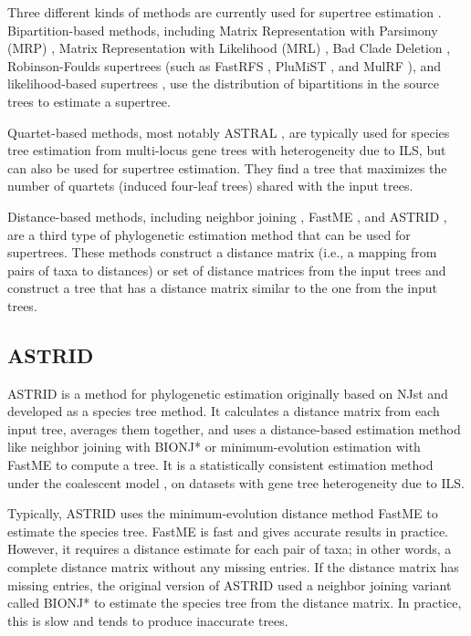 Three different kinds of methods are currently used for supertree estimation \cite{warnow2018supertree}. Bipartition-based methods, including Matrix Representation with Parsimony (MRP) \cite{ragan1992phylogenetic}, Matrix Representation with Likelihood (MRL) \cite{mrl}, Bad Clade Deletion \cite{fleischauer2017bad}, Robinson-Foulds supertrees \cite{bansal2010robinson} (such as FastRFS \cite{fastrfs}, PluMiST \cite{plumist}, and MulRF \cite{mulrf}), and likelihood-based supertrees \cite{steel2008maximum}, use the distribution of bipartitions in the source trees to estimate a supertree. 

Quartet-based methods, most notably ASTRAL \cite{ASTRAL,ASTRAL-II,astral3,ASTRAL-MP}, are typically used for species tree estimation from multi-locus gene trees with heterogeneity due to ILS, but can also be used for supertree estimation. They find a tree that maximizes the number of quartets (induced four-leaf trees) shared with the input trees. 

Distance-based methods, including neighbor joining \cite{saitou1987neighbor}, FastME \cite{lefort2015fastme}, and ASTRID \cite{vachaspati2015astrid}, are a third type of phylogenetic estimation method that can be used for supertrees. These methods construct a distance matrix (i.e., a mapping from pairs of taxa to distances) or set of distance matrices from the input trees and construct a tree that has a distance matrix similar to the one from the input trees.

\subsection{ASTRID}

ASTRID \cite{vachaspati2015astrid} is a method for phylogenetic estimation originally based on NJst \cite{liu2011estimating} and developed as a species tree method. It calculates a distance matrix from each input tree, averages them together, and uses a distance-based estimation method like neighbor joining with BIONJ* \cite{phydstar} or minimum-evolution estimation with FastME \cite{lefort2015fastme} to compute a tree. It is a statistically consistent estimation method under the coalescent model \cite{maddison1997gene}, on datasets with gene tree heterogeneity due to ILS.

Typically, ASTRID uses the minimum-evolution distance method FastME to estimate the species tree. FastME is fast and gives accurate results in practice. However, it requires a distance estimate for each pair of taxa; in other words, a complete distance matrix without any missing entries. If the distance matrix has missing entries, the original version of ASTRID used a neighbor joining variant called BIONJ* to estimate the species tree from the distance matrix. In practice, this is slow and tends to produce inaccurate trees. 

